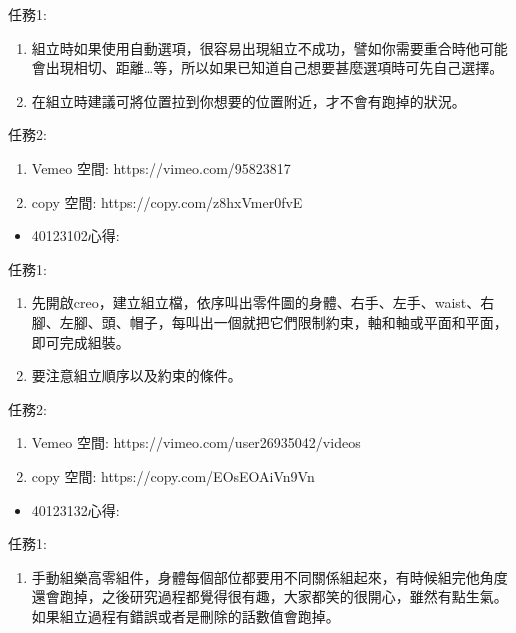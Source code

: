 \documentclass[]{article}
\begin{document}
任務1:

\begin{enumerate}
\def\labelenumi{\arabic{enumi}.}
\item
  組立時如果使用自動選項，很容易出現組立不成功，譬如你需要重合時他可能會出現相切、距離\ldots{}等，所以如果已知道自己想要甚麼選項時可先自己選擇。
\item
  在組立時建議可將位置拉到你想要的位置附近，才不會有跑掉的狀況。
\end{enumerate}

任務2:

\begin{enumerate}
\def\labelenumi{\arabic{enumi}.}
\item
  Vemeo 空間: https://vimeo.com/95823817
\item
  copy 空間: https://copy.com/z8hxVmer0fvE
\end{enumerate}

\begin{itemize}
\itemsep1pt\parskip0pt
\item
  40123102心得:
\end{itemize}

任務1:

\begin{enumerate}
\def\labelenumi{\arabic{enumi}.}
\item
  先開啟creo，建立組立檔，依序叫出零件圖的身體、右手、左手、waist、右腳、左腳、頭、帽子，每叫出一個就把它們限制約束，軸和軸或平面和平面，即可完成組裝。
\item
  要注意組立順序以及約束的條件。
\end{enumerate}

任務2:

\begin{enumerate}
\def\labelenumi{\arabic{enumi}.}
\item
  Vemeo 空間: https://vimeo.com/user26935042/videos
\item
  copy 空間: https://copy.com/EOsEOAiVn9Vn
\end{enumerate}

\begin{itemize}
\itemsep1pt\parskip0pt
\item
  40123132心得:
\end{itemize}

任務1:

\begin{enumerate}
\def\labelenumi{\arabic{enumi}.}
\itemsep1pt\parskip0pt
\item
  手動組樂高零組件，身體每個部位都要用不同關係組起來，有時候組完他角度還會跑掉，之後研究過程都覺得很有趣，大家都笑的很開心，雖然有點生氣。如果組立過程有錯誤或者是刪除的話數值會跑掉。
\end{enumerate}
\end{document}
